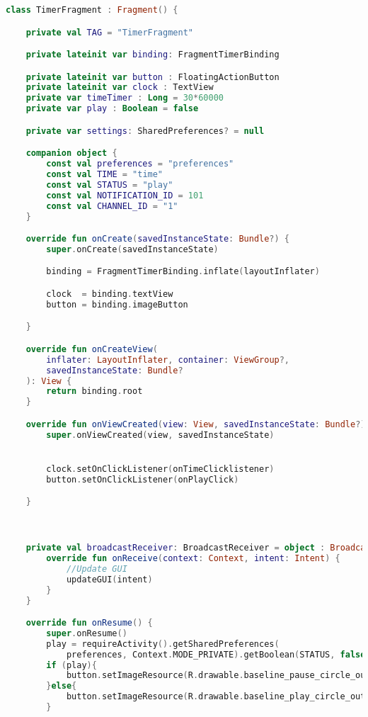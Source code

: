 \begin{lstlisting}[language=Kotlin, caption=\leftline{TimerFragment}, label=lst:TimerFragment]
class TimerFragment : Fragment() {

    private val TAG = "TimerFragment"

    private lateinit var binding: FragmentTimerBinding

    private lateinit var button : FloatingActionButton
    private lateinit var clock : TextView
    private var timeTimer : Long = 30*60000
    private var play : Boolean = false

    private var settings: SharedPreferences? = null

    companion object {
        const val preferences = "preferences"
        const val TIME = "time"
        const val STATUS = "play"
        const val NOTIFICATION_ID = 101
        const val CHANNEL_ID = "1"
    }

    override fun onCreate(savedInstanceState: Bundle?) {
        super.onCreate(savedInstanceState)

        binding = FragmentTimerBinding.inflate(layoutInflater)

        clock  = binding.textView
        button = binding.imageButton

    }

    override fun onCreateView(
        inflater: LayoutInflater, container: ViewGroup?,
        savedInstanceState: Bundle?
    ): View {
        return binding.root
    }

    override fun onViewCreated(view: View, savedInstanceState: Bundle?) {
        super.onViewCreated(view, savedInstanceState)


        clock.setOnClickListener(onTimeClicklistener)
        button.setOnClickListener(onPlayClick)

    }



    private val broadcastReceiver: BroadcastReceiver = object : BroadcastReceiver() {
        override fun onReceive(context: Context, intent: Intent) {
            //Update GUI
            updateGUI(intent)
        }
    }

    override fun onResume() {
        super.onResume()
        play = requireActivity().getSharedPreferences(
            preferences, Context.MODE_PRIVATE).getBoolean(STATUS, false)
        if (play){
            button.setImageResource(R.drawable.baseline_pause_circle_outline)
        }else{
            button.setImageResource(R.drawable.baseline_play_circle_outline)
        }


\end{lstlisting}
